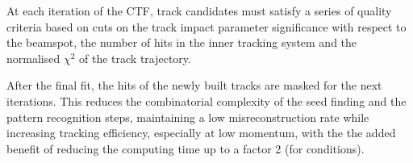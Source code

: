 At each iteration of the CTF, track candidates must satisfy a series of quality criteria
based on cuts on the track impact parameter significance with respect to the beamspot,
the number of hits in the inner tracking system and the normalised $\chi^2$ of the track trajectory.

After the final fit, the hits of the newly built tracks are masked for the next iterations.
This reduces the combinatorial complexity of the seed finding and the pattern recognition steps,
maintaining a low misreconstruction rate while increasing tracking efficiency, especially at low momentum,
with the the added benefit of reducing the computing time up to a factor 2 (for \RunII{} conditions).
